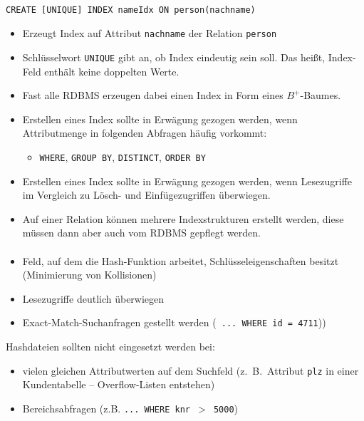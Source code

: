 \begin{frame}[fragile]{\insertsection}
\framesubtitle{\insertsubsection}
\lstset{language=sql}
\lstset{captionpos=b}		
\begin{lstlisting}[numbers=none, xleftmargin=3ex]
CREATE [UNIQUE] INDEX nameIdx ON person(nachname)
\end{lstlisting}		
\begin{itemize}
	\item Erzeugt Index auf Attribut \texttt{nachname} der Relation \texttt{person}
	\item Schlüsselwort \texttt{UNIQUE} gibt an, ob Index eindeutig sein soll. Das hei\ss t, Index-Feld enth\"alt 
	keine doppelten Werte.
	\item Fast alle RDBMS erzeugen dabei einen Index in Form eines $B^+$-Baumes. 
	\item Erstellen eines Index sollte in Erwägung gezogen werden, wenn Attributmenge in folgenden Abfragen häufig vorkommt: 
	\begin{itemize}
		\item \texttt{WHERE}, \texttt{GROUP BY}, \texttt{DISTINCT}, \texttt{ORDER BY }
	\end{itemize}
	\item Erstellen eines Index sollte in Erwägung gezogen werden, wenn Lesezugriffe im Vergleich zu L\"osch- und Einf\"ugezugriffen
	\"uberwiegen.
	\item Auf einer Relation können mehrere Indexstrukturen erstellt werden, diese müssen dann aber auch vom RDBMS gepflegt werden.
\end{itemize}	
\end{frame}

\begin{frame}{\insertsection}
\framesubtitle{\insertsubsection}
\begin{itemize}
\item Feld, auf dem die Hash-Funktion arbeitet, Schlüsseleigenschaften besitzt (Minimierung von Kollisionen)
\item Lesezugriffe deutlich \"uberwiegen
\item Exact-Match-Suchanfragen gestellt werden (\texttt{ ... WHERE id = 4711}))
\end{itemize}
Hashdateien sollten nicht eingesetzt werden bei:
\begin{itemize}
\item vielen gleichen Attributwerten auf dem Suchfeld (z.~B.~Attribut \texttt{plz} in einer Kundentabelle 
-- Overflow-Listen entstehen)
\item Bereichsabfragen (z.B. \texttt{... WHERE knr $>$ 5000})
\end{itemize}
\end{frame}

